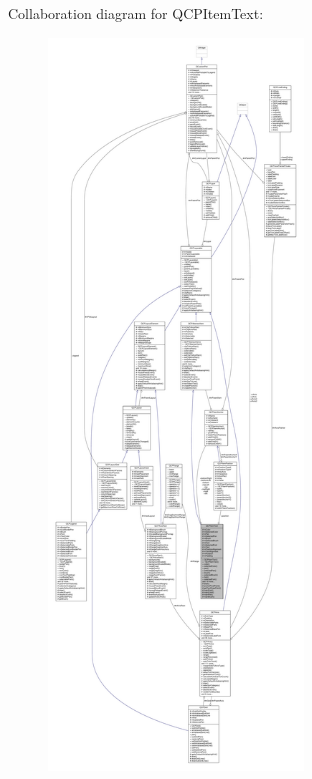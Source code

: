 Collaboration diagram for Q\+C\+P\+Item\+Text\+:\nopagebreak
\begin{figure}[H]
\begin{center}
\leavevmode
\includegraphics[height=550pt]{class_q_c_p_item_text__coll__graph}
\end{center}
\end{figure}
